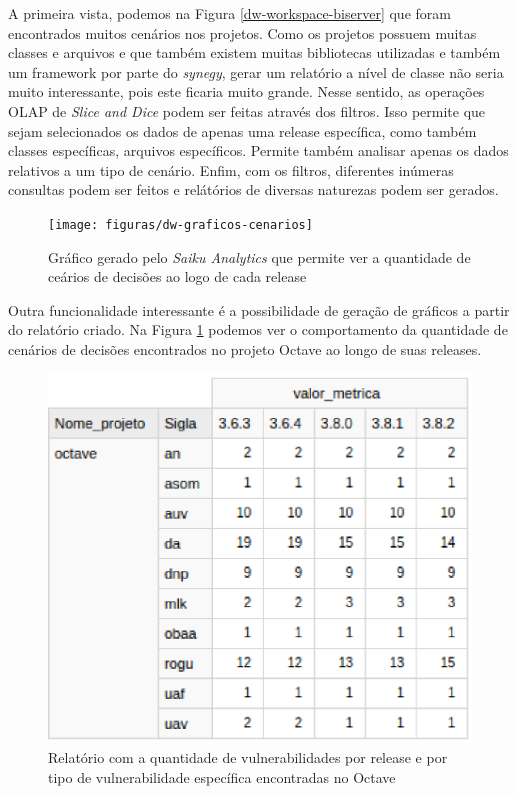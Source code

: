 A primeira vista, podemos na Figura \ref{dw-workspace-biserver} que foram encontrados muitos cenários nos projetos. Como os projetos possuem muitas classes e arquivos e que também existem muitas bibliotecas utilizadas e também um framework por parte do \emph{synegy}, gerar um relatório a nível de classe não seria muito interessante, pois este ficaria muito grande. Nesse sentido, as operações OLAP de \emph{Slice and Dice} podem ser feitas através dos filtros. Isso permite que sejam selecionados os dados de apenas uma release específica, como também classes específicas, arquivos específicos. Permite também analisar apenas os dados relativos a um tipo de cenário. Enfim, com os filtros, diferentes inúmeras consultas podem ser feitos e relátórios de diversas naturezas podem ser gerados.


\begin{figure}[H]
	\centering
	\texttt{[image: figuras/dw-graficos-cenarios]}
	\caption{Gráfico gerado pelo \emph{Saiku Analytics} que permite ver a quantidade de ceários de decisões ao logo de cada release}
	\label{dw-graficos-cenarios}
\end{figure}

Outra funcionalidade interessante é a possibilidade de geração de gráficos a partir do relatório criado. Na Figura \ref{dw-graficos-cenarios} podemos ver o comportamento da quantidade de cenários de decisões encontrados no projeto Octave ao longo de suas releases. 


\begin{figure}[H]
	\centering
	\includegraphics[scale=0.7]{figuras/dw-relatorio-octave}
	\caption{Relatório com a quantidade de vulnerabilidades por release e por tipo de vulnerabilidade específica encontradas no Octave}
	\label{dw-relatorio-octave}
\end{figure}


